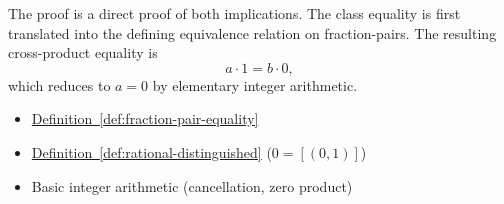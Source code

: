 \begin{remark*}
The proof is a direct proof of both implications. The class equality is
first translated into the defining equivalence relation on fraction-pairs.
The resulting cross-product equality is
\[
a\cdot 1=b\cdot 0,
\]
which reduces to $a=0$ by elementary integer arithmetic.
\end{remark*}

\begin{dependencies}
\begin{itemize}
  \item \hyperref[def:fraction-pair-equality]{Definition~\ref*{def:fraction-pair-equality}}
  \item \hyperref[def:rational-distinguished]{Definition~\ref*{def:rational-distinguished}}
        \textnormal{($0 = [(0,1)]$)}
  \item Basic integer arithmetic (cancellation, zero product)
\end{itemize}
\end{dependencies}

\clearpage
